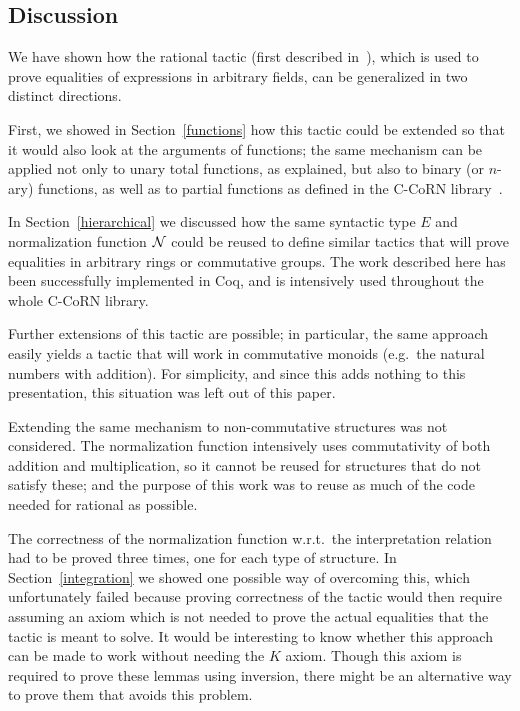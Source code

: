 \documentclass[runningheads]{llncs}
\newcommand{\N}{{\cal N}}
\newcommand{\tacticname}[1]{\textsf{#1}}
\begin{document}
\subsection{Discussion}

We have shown how the {\tacticname{rational}} tactic (first described
in~\cite{geu:wie:zwa:00}), which is used to prove equalities of expressions
in arbitrary fields, can be generalized in two distinct directions.

First, we showed in Section~\ref{functions} how this tactic could be
extended so that it would also look at the arguments of functions; the
same mechanism can be applied not only to unary total functions, as
explained, but also to binary (or $n$-ary) functions, as well as to
partial functions as defined in the C-CoRN library~\cite{ccorn}.

In Section~\ref{hierarchical} we discussed how the same syntactic type $E$
and normalization function $\N$ could be reused to define similar tactics
that will prove equalities in arbitrary rings or commutative groups.
The work described here has been successfully implemented in Coq, and
is intensively used throughout the whole C-CoRN library.

Further extensions of this tactic are possible; in particular, the same
approach easily yields a tactic that will work in commutative monoids
(e.g.\ the natural numbers with addition).  For simplicity, and since
this adds nothing to this presentation, this situation was left out of
this paper.

Extending the same mechanism to non-commutative structures was not
considered.  The normalization function intensively uses
commutativity of both addition and multiplication, so it cannot
be reused for structures that do not satisfy these; and the
purpose of this work was to reuse as much of the code needed for
{\tacticname{rational}} as possible.

The correctness of the normalization function w.r.t.\ the
interpretation relation had to be proved three times, one for each
type of structure.  In Section~\ref{integration} we showed one
possible way of overcoming this, which unfortunately failed because proving
correctness of the tactic would then require assuming an axiom which
is not needed to prove the actual equalities that the tactic is meant to solve.
It would be interesting to know whether this approach
can be made to work without needing
the $K$ axiom.
Though this axiom is required to prove these lemmas using
\tacticname{inversion}, there might be an alternative way to prove them
that avoids this problem.
\end{document}
